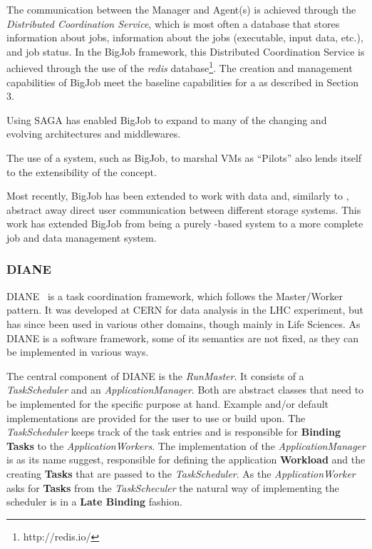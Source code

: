 \documentclass{sig-alternate}
\begin{document}
The communication between the Manager and Agent(s) is achieved through
the {\it Distributed Coordination Service}, which is most often a
database that stores information about jobs, information about the
jobs (executable, input data, etc.), and job status. In the BigJob framework,
this Distributed Coordination Service is achieved through the use
of the \textit{redis} database\footnote{http://redis.io/}.
The \pilot creation and management capabilities of BigJob meet
the baseline capabilities for a \pilotjob as described in Section 3.

Using SAGA has enabled BigJob to expand to many of the changing and evolving
architectures and middlewares.

The use of a \pilotjob system, such as BigJob, to marshal VMs as ``Pilots''
also lends itself to the extensibility of the \pilotjob concept.

Most recently, BigJob has been extended to work with data and, similarly to
\pilotjobs, abstract away direct user communication between different storage
systems.
This work has extended BigJob from being a purely \pilotjob-based system to a
more complete job and data management system.

\subsubsection{DIANE}

DIANE~\cite{Moscicki:908910} is a task coordination framework, which follows
the Master/Worker pattern.
It was developed at CERN for data analysis in the LHC experiment, but has since
been used in various other domains, though mainly in Life Sciences.
As DIANE is a software framework, some of its semantics are not fixed, as they
can be implemented in various ways.

The central component of DIANE is the \textit{RunMaster}.
It consists of a \textit{TaskScheduler} and an \textit{ApplicationManager}.
Both are abstract classes that need to be implemented for the specific purpose
at hand. Example and/or default implementations are provided for the user to
use or build upon.
The \textit{TaskScheduler} keeps track of the task entries and is responsible
for \textbf{Binding Tasks} to the \textit{ApplicationWorkers}.
The implementation of the \textit{ApplicationManager} is as its name suggest,
responsible for defining the application \textbf{Workload} and the creating
\textbf{Tasks} that are passed to the \textit{TaskScheduler}.
As the \textit{ApplicationWorker} asks for \textbf{Tasks} from the
\textit{TaskScheculer} the natural way of implementing the scheduler is in a
\textbf{Late Binding} fashion.
\end{document}
